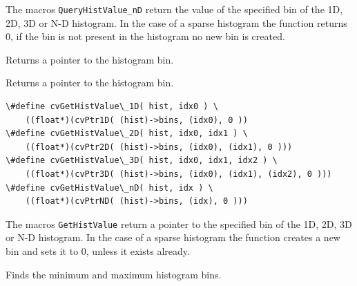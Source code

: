 The macros \texttt{QueryHistValue\_nD} return the value of the specified bin of the 1D, 2D, 3D or N-D histogram. In the case of a sparse histogram the function returns 0, if the bin is not present in the histogram no new bin is created.

\ifplastex
{} 
 
 
 Returns a pointer to the histogram bin. 
\else
{}\label{GetHistValue_nD}

Returns a pointer to the histogram bin.

\begin{lstlisting}
\#define cvGetHistValue\_1D( hist, idx0 ) \
    ((float*)(cvPtr1D( (hist)->bins, (idx0), 0 ))
\#define cvGetHistValue\_2D( hist, idx0, idx1 ) \
    ((float*)(cvPtr2D( (hist)->bins, (idx0), (idx1), 0 )))
\#define cvGetHistValue\_3D( hist, idx0, idx1, idx2 ) \
    ((float*)(cvPtr3D( (hist)->bins, (idx0), (idx1), (idx2), 0 )))
\#define cvGetHistValue\_nD( hist, idx ) \
    ((float*)(cvPtrND( (hist)->bins, (idx), 0 )))
\end{lstlisting}
\fi

\begin{description}
\end{description}

The macros \texttt{GetHistValue} return a pointer to the specified bin of the 1D, 2D, 3D or N-D histogram. In the case of a sparse histogram the function creates a new bin and sets it to 0, unless it exists already.


\label{GetMinMaxHistValue}

Finds the minimum and maximum histogram bins.


